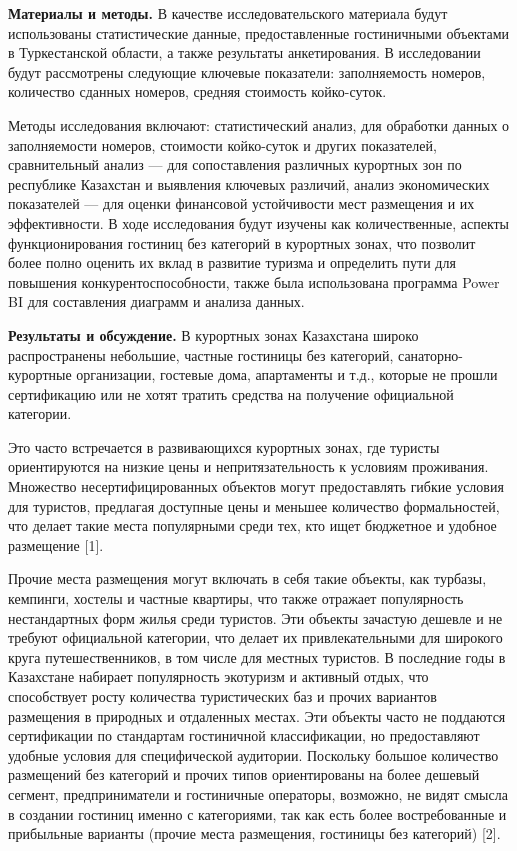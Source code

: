 {\bfseries Материалы и методы.} В качестве исследовательского материала
будут использованы статистические данные, предоставленные гостиничными
объектами в Туркестанской области, а также результаты анкетирования. В
исследовании будут рассмотрены следующие ключевые показатели:
заполняемость номеров, количество сданных номеров, средняя стоимость
койко-суток.

Методы исследования включают: статистический анализ, для обработки
данных о заполняемости номеров, стоимости койко-суток и других
показателей, сравнительный анализ --- для сопоставления различных
курортных зон по республике Казахстан и выявления ключевых различий,
анализ экономических показателей --- для оценки финансовой устойчивости
мест размещения и их эффективности. В ходе исследования будут изучены
как количественные, аспекты функционирования гостиниц без категорий в
курортных зонах, что позволит более полно оценить их вклад в развитие
туризма и определить пути для повышения конкурентоспособности, также
была использована программа Power BI для составления диаграмм и анализа
данных.

{\bfseries Результаты и обсуждение.} В курортных зонах Казахстана широко
распространены небольшие, частные гостиницы без категорий,
санаторно-курортные организации, гостевые дома, апартаменты и т.д.,
которые не прошли сертификацию или не хотят тратить средства на
получение официальной категории.

Это часто встречается в развивающихся курортных зонах, где туристы
ориентируются на низкие цены и непритязательность к условиям проживания.
Множество несертифицированных объектов могут предоставлять гибкие
условия для туристов, предлагая доступные цены и меньшее количество
формальностей, что делает такие места популярными среди тех, кто ищет
бюджетное и удобное размещение {[}1{]}.

Прочие места размещения могут включать в себя такие объекты, как
турбазы, кемпинги, хостелы и частные квартиры, что также отражает
популярность нестандартных форм жилья среди туристов. Эти объекты
зачастую дешевле и не требуют официальной категории, что делает их
привлекательными для широкого круга путешественников, в том числе для
местных туристов. В последние годы в Казахстане набирает популярность
экотуризм и активный отдых, что способствует росту количества
туристических баз и прочих вариантов размещения в природных и отдаленных
местах. Эти объекты часто не поддаются сертификации по стандартам
гостиничной классификации, но предоставляют удобные условия для
специфической аудитории. Поскольку большое количество размещений без
категорий и прочих типов ориентированы на более дешевый сегмент,
предприниматели и гостиничные операторы, возможно, не видят смысла в
создании гостиниц именно с категориями, так как есть более
востребованные и прибыльные варианты (прочие места размещения, гостиницы
без категорий) {[}2{]}.

